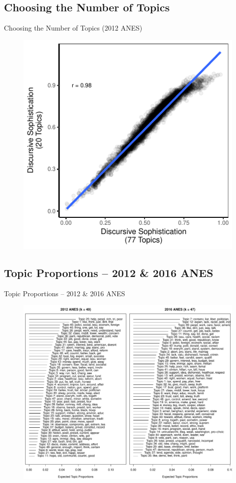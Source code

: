 \subsection{Choosing the Number of Topics}
\begin{frame}{Choosing the Number of Topics (2012 ANES)}\label{ktopics}
  \begin{figure}
  \includegraphics{fig/ktopic.pdf}
  \end{figure}
\end{frame}

\subsection{Topic Proportions -- 2012 \& 2016 ANES}
\begin{frame}{Topic Proportions -- 2012 \& 2016 ANES}\label{stm}
\begin{figure}
	\includegraphics[height=.9\textheight]{../fig/anes_stm_prop.pdf}
\end{figure}
\end{frame}

